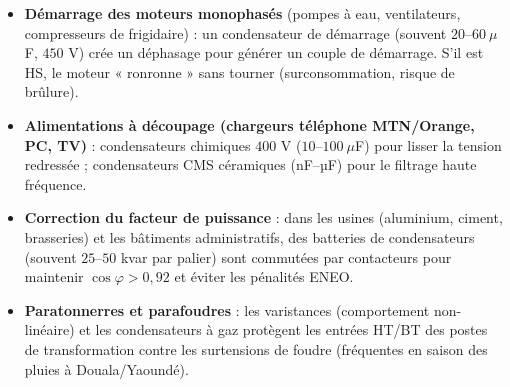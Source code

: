 \documentclass[11pt]{article}
\begin{document}
\begin{savaistu}
\begin{itemize}
\item \textbf{Démarrage des moteurs monophasés} (pompes à eau, ventilateurs, compresseurs de frigidaire) : un condensateur de démarrage (souvent $20$--$60~\mu$F, $450$ V) crée un déphasage pour générer un couple de démarrage. S'il est HS, le moteur « ronronne » sans tourner (surconsommation, risque de brûlure).
\item \textbf{Alimentations à découpage (chargeurs téléphone MTN/Orange, PC, TV)} : condensateurs chimiques $400$ V ($10$--$100~\mu$F) pour lisser la tension redressée ; condensateurs CMS céramiques (nF--µF) pour le filtrage haute fréquence.
\item \textbf{Correction du facteur de puissance} : dans les usines (aluminium, ciment, brasseries) et les bâtiments administratifs, des batteries de condensateurs (souvent $25$--$50$ kvar par palier) sont commutées par contacteurs pour maintenir $\cos\varphi > 0,92$ et éviter les pénalités ENEO.
\item \textbf{Paratonnerres et parafoudres} : les varistances (comportement non-linéaire) et les condensateurs à gaz protègent les entrées HT/BT des postes de transformation contre les surtensions de foudre (fréquentes en saison des pluies à Douala/Yaoundé).
\end{itemize}
\end{savaistu}
\end{document}
